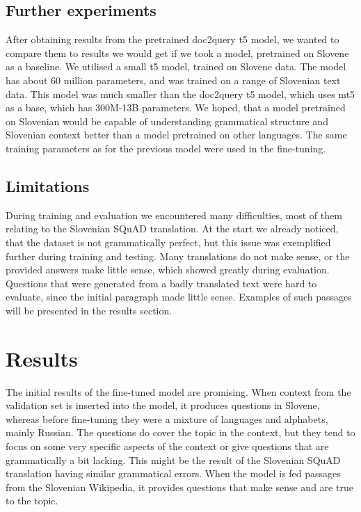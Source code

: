 \documentclass[fleqn,moreauthors,10pt]{ds_report}
\makeatletter
\newcommand\setcurrentname[1]{\def\@currentlabelname{#1}}
\makeatother
\begin{document}
\subsection*{Further experiments}
After obtaining results from the pretrained doc2query t5 model, we wanted to compare them to results we would get if we took a model, pretrained on Slovene as a baseline. We utilised a small t5 model, trained on Slovene data\cite{slot5}. The model has about 60 million parameters, and was trained on a range of Slovenian text data. This model was much smaller than the doc2query t5 model, which uses mt5\cite{DBLP:journals/corr/abs-2010-11934} as a base, which has 300M-13B parameters. We hoped, that a model pretrained on Slovenian would be capable of understanding grammatical structure and Slovenian context better than a model pretrained on other languages. The same training parameters as for the previous model were used in the fine-tuning.


\subsection*{Limitations}
During training and evaluation we encountered many difficulties, most of them relating to the Slovenian SQuAD translation. At the start we already noticed, that the dataset is not grammatically perfect, but this issue was exemplified further during training and testing. Many translations do not make sense, or the provided answers make little sense, which showed greatly during evaluation. Questions that were generated from a badly translated text were hard to evaluate, since the initial paragraph made little sense. Examples of such passages will be presented in the results section.



\section*{Results}
\setcurrentname{Results}
\label{results}

The initial results of the fine-tuned model are promising. When context from the validation set is inserted into the model, it produces questions in Slovene, whereas before fine-tuning they were a mixture of languages and alphabets, mainly Russian. The questions do cover the topic in the context, but they tend to focus on some very specific aspects of the context or give questions that are grammatically a bit lacking. This might be the result of the Slovenian SQuAD translation having similar grammatical errors. When the model is fed passages from the Slovenian Wikipedia, it provides questions that make sense and are true to the topic.
\end{document}

